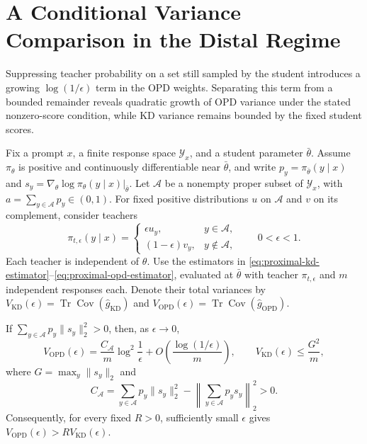 \section{A Conditional Variance Comparison in the Distal Regime}
\label{app:distal-gradient-variance}

\begin{insight}
Suppressing teacher probability on a set still sampled by the student
introduces a growing $\log(1/\epsilon)$ term in the OPD weights.
Separating this term from a bounded remainder reveals quadratic growth
of OPD variance under the stated nonzero-score condition, while KD variance
remains bounded by the fixed student scores.
\end{insight}

Fix a prompt $x$, a finite response space $\mathcal Y_x$, and a student
parameter $\bar\theta$. Assume $\pi_\theta$ is positive and continuously
differentiable near $\bar\theta$, and write
$p_y=\pi_{\bar\theta}(y\mid x)$ and
$s_y=\nabla_\theta\log\pi_\theta(y\mid x)|_{\bar\theta}$.
Let $\mathcal A$ be a nonempty proper subset of $\mathcal Y_x$, with
$a=\sum_{y\in\mathcal A}p_y\in(0,1)$. For fixed positive distributions
$u$ on $\mathcal A$ and $v$ on its complement, consider teachers
\begin{equation}
 \pi_{t,\epsilon}(y\mid x)=
 \begin{cases}
   \epsilon u_y,&y\in\mathcal A,\\
   (1-\epsilon)v_y,&y\notin\mathcal A,
 \end{cases}
 \qquad 0<\epsilon<1.
 \label{eq:distal-teacher-family}
\end{equation}
Each teacher is independent of $\theta$. Use the estimators in
\eqref{eq:proximal-kd-estimator}--\ref{eq:proximal-opd-estimator}, evaluated
at $\bar\theta$ with teacher $\pi_{t,\epsilon}$ and $m$ independent
responses each. Denote their total variances by
$V_{\mathrm{KD}}(\epsilon)=\operatorname{Tr}\operatorname{Cov}
(\widehat g_{\mathrm{KD}})$ and
$V_{\mathrm{OPD}}(\epsilon)=\operatorname{Tr}\operatorname{Cov}
(\widehat g_{\mathrm{OPD}})$.

\begin{lemma}
\label{lem:distal-gradient-variance}
If $\sum_{y\in\mathcal A}p_y\|s_y\|_2^2>0$, then, as $\epsilon\to0$,
\begin{equation}
 V_{\mathrm{OPD}}(\epsilon)
 =\frac{C_{\mathcal A}}m\log^2\frac1\epsilon
       +O\!\left(\frac{\log(1/\epsilon)}m\right),
 \qquad V_{\mathrm{KD}}(\epsilon)\le\frac{G^2}{m},
 \label{eq:distal-variance-growth}
\end{equation}
where $G=\max_y\|s_y\|_2$ and
\begin{equation}
 C_{\mathcal A}
 =\sum_{y\in\mathcal A}p_y\|s_y\|_2^2
       -\left\|\sum_{y\in\mathcal A}p_ys_y\right\|_2^2>0.
 \label{eq:distal-variance-coefficient}
\end{equation}
Consequently, for every fixed $R>0$, sufficiently small $\epsilon$
gives $V_{\mathrm{OPD}}(\epsilon)>R V_{\mathrm{KD}}(\epsilon)$.
\end{lemma}

